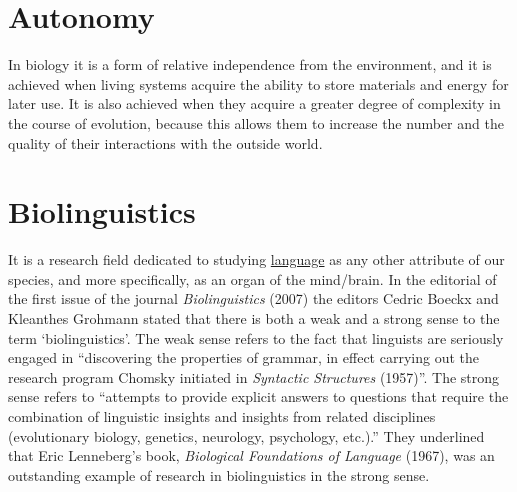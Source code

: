 \documentclass[12pt]{article}
\begin{document}
\hypertarget{autonomy}{}
\section{Autonomy}
In biology it is a form of relative independence from the environment, and it is achieved when living systems acquire the ability to store materials and energy for later use. It is also achieved when they acquire a greater degree of complexity in the course of evolution, because this allows them to increase the number and the quality of their interactions with the outside world. 


\hypertarget{biolinguistics}{}
\section{Biolinguistics}
It is a research field dedicated to studying \hyperlink{language}{language} as any other attribute of our species, and more specifically, as an organ of the mind/brain. In the editorial of the first issue of the journal \textit{Biolinguistics} (2007) the editors Cedric Boeckx and Kleanthes Grohmann stated that there is both a weak and a strong sense to the term `biolinguistics'. The weak sense refers to the fact that linguists are seriously engaged in ``discovering the properties of grammar, in effect carrying out the research program Chomsky initiated in \textit{Syntactic Structures} (1957)''. The strong sense refers to ``attempts to provide explicit answers to questions that require the combination of linguistic insights and insights from related disciplines (evolutionary biology, genetics, neurology, psychology, etc.).'' They underlined that Eric Lenneberg's book, \textit{Biological Foundations of Language} (1967), was an outstanding example of research in biolinguistics in the strong sense.


\hypertarget{biosemiotics}{}
\end{document}
